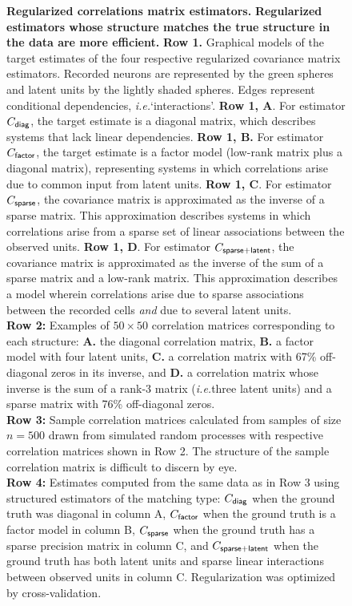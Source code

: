 \begin{figure}
\begin{leftfullpage}
\caption[Regularized correlation matrix estimators]{{\bf Regularized correlations matrix estimators.}
{\bf Regularized estimators whose structure matches the true structure in the data are more efficient.}
     {\bf Row 1.} Graphical models of the target estimates of the four respective regularized covariance matrix estimators.  Recorded neurons are represented by the green spheres and latent units by the lightly shaded spheres.  Edges represent conditional dependencies, \emph{i.e.}\;`interactions'.
     {\bf Row 1, A}.  For estimator $C_{\sf diag}$, the target estimate is a diagonal matrix, which describes systems that lack linear dependencies.
     {\bf  Row 1, B.} For estimator $C_{\sf factor}$, the target estimate is a factor model (low-rank matrix plus a diagonal matrix), representing systems in which correlations arise due to common input from latent units.
     {\bf  Row 1, C}. For estimator $C_{\sf sparse}$, the covariance matrix is approximated as the inverse of a sparse matrix. This approximation describes systems in which correlations arise from a sparse set of  linear associations between the observed units.
     {\bf  Row 1, D}.  For estimator $C_{\sf sparse+latent}$, the covariance matrix is approximated as the inverse of the sum of a sparse matrix and a low-rank matrix. This approximation describes a model wherein correlations arise due to sparse associations between the recorded cells \emph{and} due to several latent units.
     \\
     {\bf Row 2:} Examples of $50\times 50$ correlation matrices corresponding to each structure: {\bf A.} the diagonal correlation matrix, {\bf B.} a factor model with four latent units, {\bf C.}  a correlation matrix with 67\%  off-diagonal zeros in its inverse, and {\bf  D.} a correlation matrix whose inverse is the sum of a rank-3 matrix (\emph{i.e.}\;three latent units) and a sparse matrix with 76\% off-diagonal zeros.
     \\
{\bf Row 3:} Sample correlation matrices calculated from samples of size $n=500$ drawn from simulated random processes with respective correlation matrices shown in Row 2.  The structure of the sample correlation matrix is difficult to discern by eye.
     \\
{\bf Row 4:} Estimates computed from the same data as in Row 3 using structured estimators of the matching type: $C_{\sf diag}$ when the ground truth was diagonal in column A, $C_{\sf factor}$ when the ground truth is a factor model in column B, $C_{\sf sparse}$ when the ground truth has a sparse precision matrix in column C, and $C_{\sf sparse+latent}$ when the ground truth has both latent units and sparse linear interactions between observed units in column C.  Regularization was optimized by cross-validation. 
}
\end{leftfullpage}
\end{figure}

